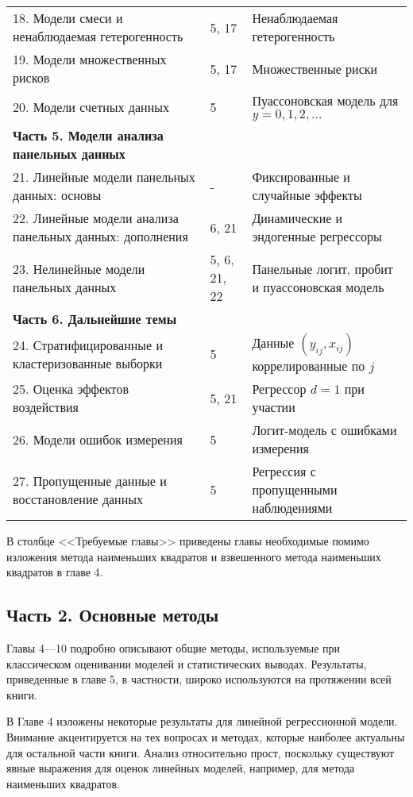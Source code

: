 \begin{table}[h]
\begin{center}
\begin{tabular}{p{8cm}p{1cm}p{6cm}}
18. Модели смеси и ненаблюдаемая гетерогенность & 5, 17 & Ненаблюдаемая гетерогенность \\
19. Модели множественных рисков & 5, 17 & Множественные риски \\
20. Модели счетных данных & 5 & Пуассоновская модель для $y=0, 1, 2, \ldots$ \\
\textbf{Часть 5. Модели анализа панельных данных} & & \\
21. Линейные модели панельных данных: основы & - & Фиксированные и случайные эффекты \\
22. Линейные модели анализа панельных данных: дополнения & 6, 21 & Динамические и эндогенные регрессоры \\
23. Нелинейные модели панельных данных & 5, 6, 21, 22 & Панельные логит, пробит и пуассоновская модель \\
\textbf{Часть 6. Дальнейшие темы} & & \\
24. Стратифицированные и кластеризованные выборки & 5 & Данные $(y_{ij},x_{ij})$ коррелированные по $j$ \\
25. Оценка эффектов воздействия & 5, 21 & Регрессор $d=1$ при участии \\
26. Модели ошибок измерения & 5 & Логит-модель с ошибками измерения\\
27. Пропущенные данные и восстановление данных & 5 & Регрессия с пропущенными наблюдениями 
\end{tabular}
\end{center}
\end{table}
В столбце <<Требуемые главы>> приведены главы необходимые помимо изложения метода наименьших квадратов и взвешенного метода наименьших квадратов в главе 4. 


\subsection{Часть 2. Основные методы}

Главы 4---10 подробно описывают общие методы, используемые при классическом оценивании моделей и статистических выводах. Результаты, приведенные в главе 5, в частности, широко используются на протяжении всей книги.
	
	
В Главе 4 изложены некоторые результаты для линейной регрессионной модели. Внимание  акцентируется  на тех вопросах и методах, которые наиболее актуальны для остальной части книги. Анализ относительно прост, поскольку существуют явные выражения для оценок линейных моделей, например, для метода наименьших квадратов.


